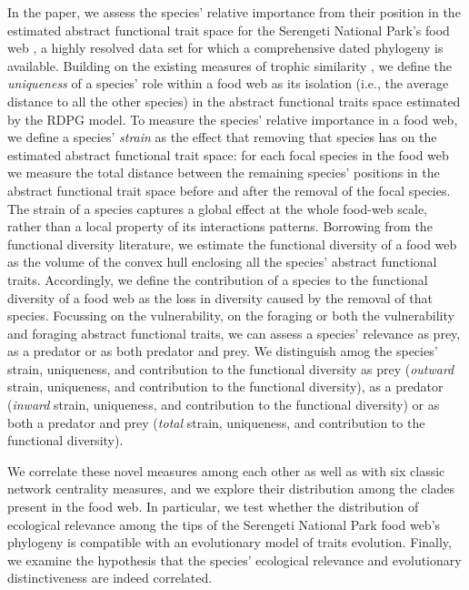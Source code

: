\documentclass[12pt]{article}
\begin{document}
In the paper, we assess the  species' relative importance from their position in
the estimated abstract functional trait space for the Serengeti National Park's
food web \citep{baskerville2011spatial}, a highly resolved data set for which 
a comprehensive dated phylogeny is available. Building on the existing measures
of trophic similarity \citep{yodzis1999search,luczkovich2003defining,jordan2009trophic}, we define
the \emph{uniqueness} of a species' role within a food web as its
isolation (i.e., the average distance to all the other species) in the abstract
functional traits space estimated by the RDPG model. To measure the 
species' relative importance in a food web, we define a species' \emph{strain} as the
effect that removing that species has on the estimated abstract functional
trait space: for each focal species in the food web we measure the total
distance between the remaining species' positions in the abstract functional
trait space before and after the removal of the focal species. The strain of a species
captures a global effect at the whole food-web scale, rather than a local property of its interactions patterns.
Borrowing from the functional diversity literature, we estimate the functional diversity of a food web as the
volume of the convex hull enclosing all the species' abstract functional
traits. Accordingly, we define the contribution of a species to the functional
diversity of a food web as the loss in diversity caused by the removal of that
species.  Focussing on the vulnerability, on the foraging or both the
vulnerability and foraging abstract functional traits, we can assess a
species' relevance as prey, as a predator or as both predator and prey. We
distinguish amog the species' strain, uniqueness, and contribution to the
functional diversity as prey (\emph{outward} strain, uniqueness, and contribution to
the functional diversity), as a predator (\emph{inward} strain, uniqueness,
and contribution to the functional diversity) or as both a predator and prey
(\emph{total} strain, uniqueness, and contribution to the functional diversity).

We correlate these novel measures among each other as well as with six classic
network centrality measures, and we explore their distribution among the clades
present in the food web. In particular, we test whether the distribution of
ecological relevance among the tips of the Serengeti National Park food web's
phylogeny is compatible with an evolutionary model of traits evolution.
Finally, we examine the hypothesis that the species' ecological relevance and
evolutionary distinctiveness are indeed correlated.
\end{document}
